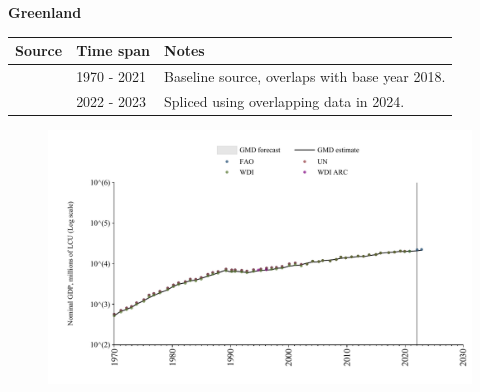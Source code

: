 \documentclass[12pt,a4paper,landscape]{article}
\begin{document}
\begin{adjustbox}{max totalsize={\paperwidth}{\paperheight},center}
\begin{minipage}[t][\textheight][t]{\textwidth}
\vspace*{0.5cm}
{}
\begin{center}
{\Large\bfseries Greenland}
\end{center}
\vspace{0.5cm}
\begin{table}[H]
\centering
\small
\begin{tabular}{|l|l|l|}
\hline
\textbf{Source} & \textbf{Time span} & \textbf{Notes} \\
\hline
\rowcolor{white}\cite{WDI}& 1970 - 2021 &Baseline source, overlaps with base year 2018.\\
\rowcolor{lightgray}\cite{FAO}& 2022 - 2023 &Spliced using overlapping data in 2024.\\
\hline
\end{tabular}
\end{table}
\begin{figure}[H]
\centering
\includegraphics[width=\textwidth,height=0.6\textheight,keepaspectratio]{graphs/GRL_nGDP.pdf}
\end{figure}
\end{minipage}
\end{adjustbox}
\end{document}
